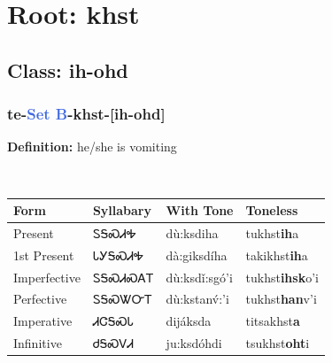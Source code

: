 \needspace{4in}
\section*{Root: khst}
\nopagebreak
{}
\needspace{3in}
\subsection*{Class: ih-ohd}
\nopagebreak
\needspace{2in}
\subsubsection*{te{-}\textcolor{RoyalBlue}{Set B}{-}\textbf{khst}{-}[ih-ohd]}
\nopagebreak
\textbf{Definition: } he/she is vomiting
\\[0.5em]
\begin{tabularx}{\textwidth}{l X X X}%
\toprule%
\textbf{Form}&\textbf{Syllabary}&\textbf{With Tone}&\textbf{Toneless}\\%
\midrule%
Present&ᏚᎦᏍᏗᎭ&dù:ksdiha&tukhst\textbf{ih}a\\%
1st Present&ᏓᎩᎦᏍᏗᎭ&dà:giksdíha&takikhst\textbf{ih}a\\%
Imperfective&ᏚᎦᏍᏗᏍᎪᎢ&dù:ksdǐ:sgó’i&tukhst\textbf{ihsk}o'i\\%
Perfective&ᏚᎦᏍᏔᏅᎢ&dù:kstanv́:’i&tukhst\textbf{han}v'i\\%
Imperative&ᏗᏣᎦᏍᏓ&dijáksda&titsakhst\textbf{a}\\%
Infinitive&ᏧᎦᏍᏙᏗ&ju:ksdóhdi&tsukhst\textbf{oht}i\\%
\bottomrule%
\end{tabularx}
\\[1em]